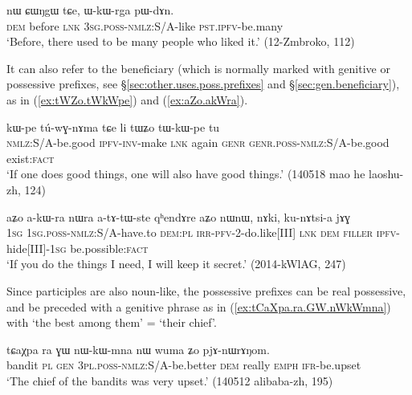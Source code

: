  \begin{exe} 
\ex \label{ex:WkWrga.pWdAn}
\gll  nɯ ɕɯŋgɯ tɕe, ɯ-kɯ-rga pɯ-dɤn. \\
\textsc{dem} before \textsc{lnk} \textsc{3sg}.\textsc{poss}-\textsc{nmlz}:S/A-like \textsc{pst}.\textsc{ipfv}-be.many \\
\glt  `Before, there used to be many people who liked it.' (12-Zmbroko, 112)
\end{exe}

It can also refer to the beneficiary (which is normally marked with genitive or possessive prefixes, see §\ref{sec:other.uses.poss.prefixes} and §\ref{sec:gen.beneficiary}), as in (\ref{ex:tWZo.tWkWpe}) and (\ref{ex:aZo.akWra}).

 \begin{exe} 
\ex \label{ex:tWZo.tWkWpe}
\gll  kɯ-pe tú-wɣ-nɤma tɕe li tɯʑo tɯ-kɯ-pe tu \\
\textsc{nmlz}:S/A-be.good \textsc{ipfv}-\textsc{inv}-make \textsc{lnk} again \textsc{genr} \textsc{genr}.\textsc{poss}-\textsc{nmlz}:S/A-be.good exist:\textsc{fact} \\
\glt  `If one does good things, one will also have good things.' (140518 mao he laoshu-zh, 124)
\end{exe}

 \begin{exe} 
\ex \label{ex:aZo.akWra}
\gll  aʑo a-kɯ-ra nɯra a-tɤ-tɯ-ste qʰendɤre aʑo nɯnɯ, nɤki, ku-nɤtsi-a jɤɣ \\
\textsc{1sg} \textsc{1sg}.\textsc{poss}-\textsc{nmlz}:S/A-have.to \textsc{dem}:\textsc{pl} \textsc{irr}-\textsc{pfv}-2-do.like[III] \textsc{lnk} \textsc{dem} \textsc{filler} \textsc{ipfv}-hide[III]-\textsc{1sg} be.possible:\textsc{fact}  \\
\glt  `If you do the things I need, I will keep it secret.'  (2014-kWlAG, 247)
\end{exe}

Since participles are also noun-like, the possessive prefixes can be real possessive, and be preceded with a genitive phrase as in (\ref{ex:tCaXpa.ra.GW.nWkWmna}) with  `the best among them' = `their chief'.

 \begin{exe} 
\ex \label{ex:tCaXpa.ra.GW.nWkWmna}
\gll tɕaχpa ra ɣɯ nɯ-kɯ-mna nɯ wuma ʑo pjɤ-nɯrɤŋom. \\
bandit \textsc{pl} \textsc{gen} \textsc{3pl}.\textsc{poss}-\textsc{nmlz}:S/A-be.better \textsc{dem} really \textsc{emph} \textsc{ifr}-be.upset \\
\glt `The chief of the bandits was very upset.' (140512 alibaba-zh, 195)
\end{exe}


